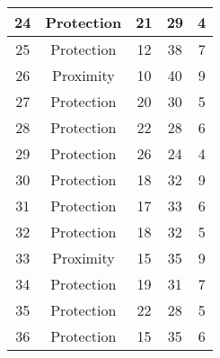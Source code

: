 \documentclass[results.tex]{subfiles}
\begin{document}
\begin{center}
\begin{tabular}{| c || c | c | c | c |}
            \hline
            24                      & Protection                   & 21                     & 29                      & 4                    \\
            \hline
            25                      & Protection                   & 12                     & 38                      & 7                    \\
            \hline
            26                      & Proximity                    & 10                     & 40                      & 9                    \\
            \hline
            27                      & Protection                   & 20                     & 30                      & 5                    \\
            \hline
            28                      & Protection                   & 22                     & 28                      & 6                    \\
            \hline
            29                      & Protection                   & 26                     & 24                      & 4                    \\
            \hline
            30                      & Protection                   & 18                     & 32                      & 9                    \\
            \hline
            31                      & Protection                   & 17                     & 33                      & 6                    \\
            \hline
            32                      & Protection                   & 18                     & 32                      & 5                    \\
            \hline
            33                      & Proximity                    & 15                     & 35                      & 9                    \\
            \hline
            34                      & Protection                   & 19                     & 31                      & 7                    \\
            \hline
            35                      & Protection                   & 22                     & 28                      & 5                    \\
            \hline
            36                      & Protection                   & 15                     & 35                      & 6                    \\

\end{tabular}
\end{center}
\end{document}
